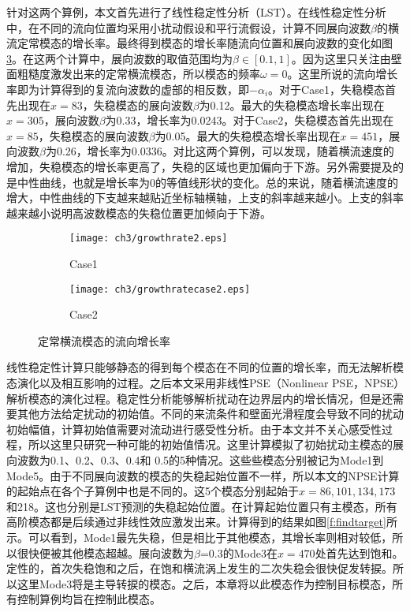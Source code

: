 针对这两个算例，本文首先进行了线性稳定性分析（LST）。在线性稳定性分析中，在不同的流向位置均采用小扰动假设和平行流假设，计算不同展向波数$\beta$的横流定常模态的增长率。最终得到模态的增长率随流向位置和展向波数的变化如图\ref{f:LST}。在这两个计算中，展向波数的取值范围均为$\beta\in[0.1,1]$。因为这里只关注由壁面粗糙度激发出来的定常横流模态，所以模态的频率$\omega = 0$。这里所说的流向增长率即为计算得到的复流向波数的虚部的相反数，即$-\alpha_i$。对于Case1，失稳模态首先出现在$x = 83$，失稳模态的展向波数$\beta$为0.12。最大的失稳模态增长率出现在$x =305$，展向波数$\beta$为0.33，增长率为0.0243。对于Case2，失稳模态首先出现在$x = 85$，失稳模态的展向波数$\beta$为0.05。最大的失稳模态增长率出现在$x =451$，展向波数$\beta$为0.26，增长率为0.0336。对比这两个算例，可以发现，随着横流速度的增加，失稳模态的增长率更高了，失稳的区域也更加偏向于下游。另外需要提及的是中性曲线，也就是增长率为0的等值线形状的变化。总的来说，随着横流速度的增大，中性曲线的下支越来越贴近坐标轴横轴，上支的斜率越来越小。上支的斜率越来越小说明高波数模态的失稳位置更加倾向于下游。

\begin{figure}[htb]
  \centering
  \begin{subfigure}{0.48\linewidth}
    \texttt{[image: ch3/growthrate2.eps]}
    \caption{Case1}\label{modesenergycase3}
  \end{subfigure}
  \begin{subfigure}{0.48\linewidth}
    \texttt{[image: ch3/growthratecase2.eps]}
    \caption{Case2}\label{modesenergycase1}
  \end{subfigure}
  \caption{定常横流模态的流向增长率}\label{f:LST}
\end{figure}

线性稳定性计算只能够静态的得到每个模态在不同的位置的增长率，而无法解析模态演化以及相互影响的过程。之后本文采用非线性PSE（Nonlinear PSE，NPSE）解析模态的演化过程。稳定性分析能够解析扰动在边界层内的增长情况，但是还需要其他方法给定扰动的初始值。不同的来流条件和壁面光滑程度会导致不同的扰动初始幅值，计算初始值需要对流动进行感受性分析。由于本文并不关心感受性过程，所以这里只研究一种可能的初始值情况。这里计算模拟了初始扰动主模态的展向波数为0.1、0.2、0.3、0.4和 0.5的5种情况。这些些模态分别被记为Mode1到Mode5。由于不同展向波数的模态的失稳起始位置不一样，所以本文的NPSE计算的起始点在各个子算例中也是不同的。这5个模态分别起始于$x=86,101,134,173$和218。这也分别是LST预测的失稳起始位置。在计算起始位置只有主模态，所有高阶模态都是后续通过非线性效应激发出来。计算得到的结果如图\ref{f:findtarget}所示。可以看到，Mode1最先失稳，但是相比于其他模态，其增长率则相对较低，所以很快便被其他模态超越。展向波数为$\beta$=0.3的Mode3在$x = 470$处首先达到饱和。定性的，首次失稳饱和之后，在饱和横流涡上发生的二次失稳会很快促发转捩。所以这里Mode3将是主导转捩的模态。之后，本章将以此模态作为控制目标模态，所有控制算例均旨在控制此模态。

